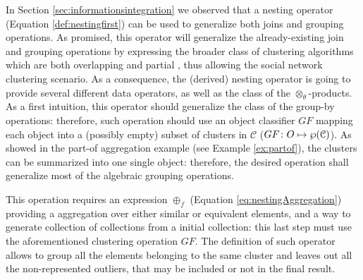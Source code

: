 In Section \vref{sec:informationsintegration} we observed that a nesting operator (Equation \vref{def:nestingfirst}) can be used to generalize both joins and grouping operations. As promised, this operator will generalize the already-existing join and grouping operations by  expressing the broader class of clustering algorithms which are both overlapping and partial \cite{Tan05}, thus allowing  the social network clustering scenario. As a consequence, the (derived) nesting operator is going to provide several different data operators, as well as the class of the $\otimes_\theta$-products. As a first intuition, this operator should generalize the class of the group-by operations: therefore, such operation should use an
object classifier  $GF$ mapping each object into a (possibly empty) subset of clusters in $\mathcal{C}$ ($GF\colon O\mapsto \wp(\mathcal{C})$). As showed in the part-of aggregation example (see Example \vref{ex:partof}), the clusters can be   summarized into one single object: therefore, the desired operation shall generalize most of the algebraic grouping operations.


This operation requires an expression $\oplus_f$ (Equation \vref{eq:nestingAggregation}) providing  a aggregation over either similar or equivalent elements, and a way to generate collection of collections from a initial collection: this last step must use the aforementioned clustering operation $GF$. The definition of such  operator allows to group all the elements belonging to the same cluster and leaves out all the non-represented outliers, that may be included or not in the final result. 
\medskip


